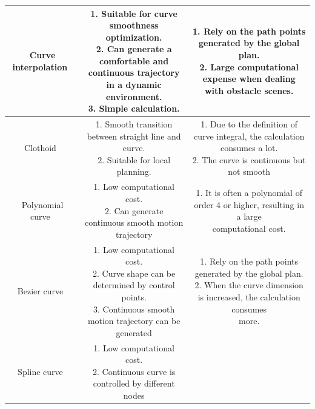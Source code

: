 \documentclass[conference]{IEEEtran}
\begin{document}
\begin{table}[htbp]
\begin{tabular}{|c|c|c|}
		\hline
		Curve interpolation~\cite{gonzalez2015review} & \makecell[l]{1. Suitable for curve smoothness optimization.\\ 2. Can generate a comfortable and continuous trajectory \\in a dynamic environment.\\ 3. Simple calculation. \\}  & \makecell[l]{1. Rely on the path points generated by the global plan.\\ 2. Large computational expense when dealing with obstacle scenes.}\\
		\hline
		Clothoid~\cite{brezak2013real} & \makecell[l]{1. Smooth transition between straight line and curve.\\ 2. Suitable for local planning.\\}  & \makecell[l]{1. Due to the definition of curve integral, the calculation consumes a lot.\\ 2. The curve is continuous but not smooth}\\
		\hline
		Polynomial curve~\cite{piazzi2002quintic,glaser2010maneuver,simon1999vehicle} & \makecell[l]{1. Low computational cost.\\ 2. Can generate continuous smooth motion trajectory\\}  & \makecell[l]{1. It is often a polynomial of order 4 or higher, resulting in a large \\ computational cost.}\\
		\hline
		Bezier curve~\cite{rastelli2014dynamic, choi2008path} & \makecell[l]{1. Low computational cost. \\2. Curve shape can be determined by control points.\\ 3. Continuous smooth motion trajectory can be generated\\ }  & \makecell[l]{1. Rely on the path points generated by the global plan. \\ 2. When the curve dimension is increased, the calculation consumes \\ more. }\\
		\hline
		Spline curve~\cite{shiller1991dynamic, berglund2009planning} & \makecell[l]{1. Low computational cost.\\ 2. Continuous curve is controlled by different nodes\\ }  & \makecell[l]{1. The resulting path may not be optimal. }\\
		\hline
	\end{tabular}
\end{table}
\end{document}
